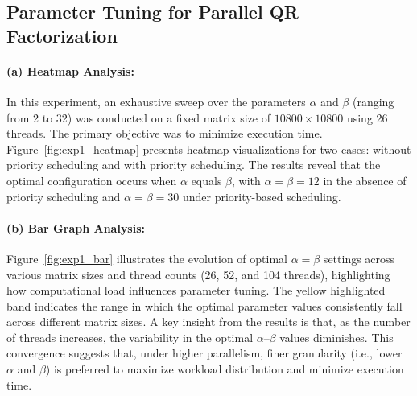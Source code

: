 \subsection{Parameter Tuning for Parallel QR Factorization}\label{exp:exp1}
\paragraph{(a) Heatmap Analysis:} 
In this experiment, an exhaustive sweep over the parameters $\alpha$ and $\beta$ (ranging from 2 to 32) was conducted on a fixed matrix size of $10800 \times 10800$ using 26 threads. The primary objective was to minimize execution time. Figure~\ref{fig:exp1_heatmap} presents heatmap visualizations for two cases: without priority scheduling and with priority scheduling. The results reveal that the optimal configuration occurs when $\alpha$ equals $\beta$, with $\alpha=\beta=12$ in the absence of priority scheduling and $\alpha=\beta=30$ under priority-based scheduling.


\paragraph{(b) Bar Graph Analysis:} Figure~\ref{fig:exp1_bar} illustrates the evolution of optimal $\alpha=\beta$ settings across various matrix sizes and thread counts (26, 52, and 104 threads), highlighting how computational load influences parameter tuning. The yellow highlighted band indicates the range in which the optimal parameter values consistently fall across different matrix sizes.
A key insight from the results is that, as the number of threads increases, the variability in the optimal $\alpha$–$\beta$ values diminishes. This convergence suggests that, under higher parallelism, finer granularity (i.e., lower $\alpha$ and $\beta$) is preferred to maximize workload distribution and minimize execution time.


